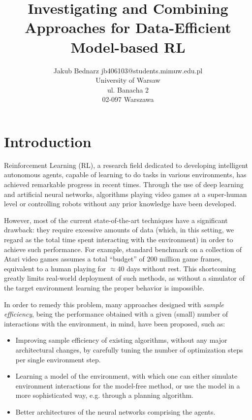 \documentclass[twoside,11pt]{article}
\begin{document}
\title{Investigating and Combining Approaches for Data-Efficient Model-based RL}

\author{
  \name Jakub Bednarz
  \email jb406103@students.mimuw.edu.pl \\
  \addr University of Warsaw \\
  ul. Banacha 2 \\
  02-097 Warszawa
}

\maketitle

\section{Introduction}

Reinforcement Learning (RL), a research field dedicated to developing intelligent autonomous agents, capable of learning to do tasks in various environments, has achieved remarkable progress in recent times. Through the use of deep learning and artificial neural networks, algorithms playing video games at a super-human level or controlling robots without any prior knowledge have been developed.

However, most of the current state-of-the-art techniques have a significant drawback: they require excessive amounts of data (which, in this setting, we regard as the total time spent interacting with the environment) in order to achieve such performance. For example, standard benchmark on a collection of Atari video games assumes a total ``budget'' of 200 million game frames, equivalent to a human playing for $\approx 40$ days without rest. This shortcoming greatly limits real-world deployment of such methods, as without a simulator of the target environment learning the proper behavior is impossible.

In order to remedy this problem, many approaches designed with \emph{sample efficiency}, being the performance obtained with a given (small) number of interactions with the environment, in mind, have been proposed, such as:

\begin{itemize}
  \item Improving sample efficiency of existing algorithms, without any major architectural changes, by carefully tuning the number of optimization steps per single environment step.
  \item Learning a model of the environment, with which one can either simulate environment interactions for the model-free method, or use the model in a more sophisticated way, e.g. through a planning algorithm.
  \item Better architectures of the neural networks comprising the agents.
\end{itemize}
\end{document}

